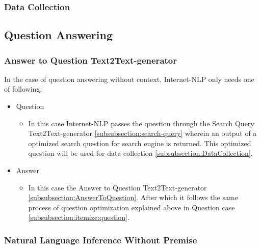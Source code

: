 \subsubsection{Data Collection \label{subsubsection:DataCollection}}

\subsection{Question Answering}

\subsubsection{Answer to Question Text2Text-generator}

In the case of question answering without context, Internet-NLP only needs one of following:

\begin{itemize}
    \item Question
    \begin{itemize}
        \item In this case Internet-NLP passes the question through the Search Query Text2Text-generator \ref{subsubsection:search-query} wherein an output of a optimized search question for search engine is returned. This optimized question will be used for data collection \ref{subsubsection:DataCollection}.
        \label{subsubsection:itemize:question}
    \end{itemize}
    \item Answer
    \begin{itemize}
        \item In this case the Answer to Question Text2Text-generator \ref{subsubsection:AnswerToQuestion}. After which it follows the same process of question optimization explained above in Question case \ref{subsubsection:itemize:question}.
    \end{itemize}
\end{itemize}

\subsubsection{Natural Language Inference Without Premise}

